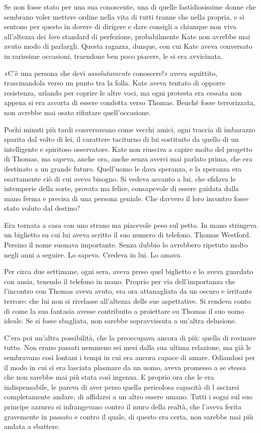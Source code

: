 \documentclass[a4paper,oneside,11pt]{memoir}
\begin{document}
Se non fosse stato per una sua conoscente, una di quelle fastidiosissime donne che sembrano voler mettere ordine nella
vita di tutti tranne che nella propria, e si sentono per questo in dovere di dirigere e dare consigli a chiunque non
viva all'altezza dei \emph{loro} standard di perfezione, probabilmente Kate non avrebbe mai avuto modo di parlargli.
Questa ragazza, dunque, con cui Kate aveva conversato in rarissime occasioni, traendone ben poco piacere, le si
era avvicinata.

«C'è una persona che devi \emph{assolutamente} conoscere!» aveva squittito, trascinandola verso un punto tra la folla.
Kate aveva tentato di opporre resistenza, urlando per coprire le altre voci, ma ogni protesta era cessata non appena si
era accorta di essere condotta verso Thomas. Benché fosse terrorizzata, non avrebbe mai osato rifiutare quell'occasione.

Pochi minuti più tardi conversavano come vecchi amici, ogni traccia di imbarazzo sparita dal volto di lei, il carattere
taciturno di lui sostituito da quello di un intelligente e spiritoso osservatore. Kate non riusciva a capire molto del
progetto di Thomas, ma sapeva, anche ora, anche senza averci mai parlato prima, che era destinato a un grande futuro.
Quell'uomo le dava speranza, e la speranza era esattamente ciò di cui aveva bisogno. Si vedeva accanto a lui, che
sfidava le intemperie della sorte, provata ma felice, consapevole di essere guidata dalla mano ferma e precisa di una
persona geniale. Che davvero il loro incontro fosse stato voluto dal destino?

Era tornata a casa con uno strano ma piacevole peso sul petto. In mano stringeva un biglietto su cui lui aveva scritto
il suo numero di telefono. Thomas Westford. Persino il nome suonava importante. Senza dubbio lo avrebbero ripetuto molto
negli anni a seguire. Lo sapeva. Credeva in lui. Lo amava.

Per circa due settimane, ogni sera, aveva preso quel biglietto e lo aveva guardato con ansia, tenendo il telefono in
mano. Proprio per via dell'importanza che l'incontro con Thomas aveva avuto, era ora attanagliata da un oscuro e
irritante terrore: che lui non si rivelasse all'altezza delle sue aspettative. Si rendeva conto di come la sua fantasia
avesse contribuito a proiettare su Thomas il suo uomo ideale. Se si fosse sbagliata, non sarebbe sopravvissuta a
un'altra delusione.

C'era poi un'altra possibilità, che la preoccupava ancora di più: quella di rovinare tutto. Non erano passati nemmeno
sei mesi dalla sua ultima relazione, ma già le sembravano così lontani i tempi in cui era ancora capace di amare.
Odiandosi per il modo in cui si era lasciata plasmare da un uomo, aveva promesso a se stessa che non sarebbe mai più
stata così ingenua. E proprio ora che le era indispensabile, le pareva di aver perso quella pericolosa capacità di l
asciarsi completamente andare, di affidarsi a un altro essere umano. Tutti i sogni sul suo principe azzurro si
infrangevano contro il muro della realtà, che l'aveva ferita gravemente in passato e contro il quale, di questo era
certa, non sarebbe mai più andata a sbattere.
\end{document}
